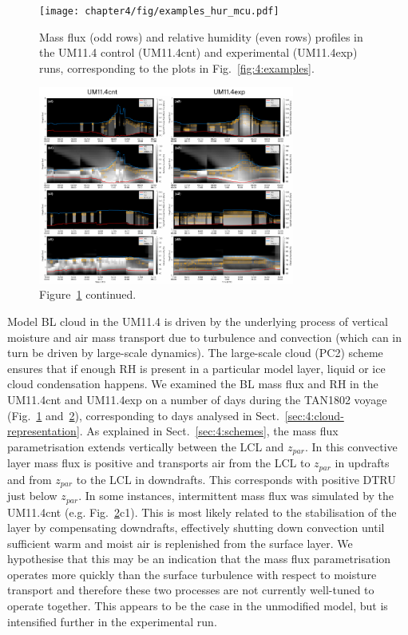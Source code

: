 \begin{figure}[p]
\centering
\texttt{[image: chapter4/fig/examples\_hur\_mcu.pdf]}
\caption[Mass flux and relative humidity profiles]{Mass flux (odd rows) and relative humidity (even rows) profiles in the UM11.4 control (UM11.4cnt)
and experimental (UM11.4exp) runs, corresponding to the plots in Fig.~\ref{fig:4:examples}.
}
\label{fig:4:examples-hur-mcu}
\end{figure}

\begin{figure}[t]
\centering
\includegraphics[width=0.75\textwidth]{chapter4/fig/examples_hur_mcu_cont.pdf}
\caption[Figure~\ref{fig:4:examples-hur-mcu} continued]{Figure~\ref{fig:4:examples-hur-mcu} continued.}
\label{fig:4:examples-hur-mcu-cont}
\end{figure}

Model BL cloud in the UM11.4 is driven by the underlying process
of vertical moisture and air mass transport due to turbulence and convection
(which can in turn be driven by large-scale dynamics). The large-scale cloud
(PC2) scheme ensures that if enough RH is present in a particular model
layer, liquid or ice cloud condensation happens. We examined the BL mass
flux and RH in the UM11.4cnt and UM11.4exp on a number of days during the TAN1802
voyage (Fig.~\ref{fig:4:examples-hur-mcu} and~\ref{fig:4:examples-hur-mcu-cont}),
corresponding to days analysed in Sect.~\ref{sec:4:cloud-representation}.
As explained in Sect.~\ref{sec:4:schemes}, the mass flux parametrisation
extends vertically between the LCL and $z_{par}$. In this convective layer mass
flux is positive and transports air from the LCL to $z_{par}$ in updrafts
and from $z_{par}$ to the LCL in downdrafts.
This corresponds with positive
DTRU just below $z_{par}$. In some instances, intermittent mass flux was
simulated by the UM11.4cnt (e.g. Fig.~\ref{fig:4:examples-hur-mcu-cont}c1). This
is most likely related to the stabilisation of the layer by compensating
downdrafts, effectively shutting down convection until sufficient warm
and moist air is replenished from the surface layer. We hypothesise that this
may be an indication that the mass flux parametrisation operates more quickly
than the surface turbulence with respect to moisture transport and therefore these two processes are not currently well-tuned to operate together. This appears to be the case in the unmodified
model, but is intensified further in the experimental run.

